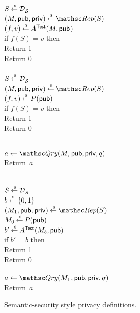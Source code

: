 %
\begin{figure}[htbp]
\centering
{}
{
{

\\
$S\getsr \distr{\calS}{}$\\
$(M,\pubaux,\privaux) \getsr \Rep(S)$\\
$(f,v) \getsr A^{\TestOracle}(M,\pubaux)$\\
if $f(S)=v$ then\\
\nudge Return 1\\
Return 0\\

\medskip
{}\\
$S\getsr \distr{\calS}{}$\\
$(M,\pubaux,\privaux) \getsr \Rep(S)$\\
$(f,v) \getsr P(\pubaux)$\\
if $f(S)=v$ then\\
\nudge Return 1\\
Return 0\\
}
%
{
\\
$a \gets \Qry(M,\pubaux,\privaux,q)$\\
Return~$a$\\
}
}
{
{
\\
$S\getsr \distr{\calS}{}$\\
$b \getsr \bits$\\
$(M_1,\pubaux,\privaux) \getsr \Rep(S)$\\
$M_0 \getsr P(\pubaux)$\\
$b' \getsr A^{\TestOracle}(M_b,\pubaux)$\\
if $b'=b$ then\\
\nudge Return 1\\
Return 0\\
%
}
%
{
\\
$a \gets \Qry(M_1,\pubaux,\privaux,q)$\\
Return~$a$\\
}
}
\caption{Semantic-security style privacy definitions. } 
\label{fig:privacy-ss}
\end{figure}
